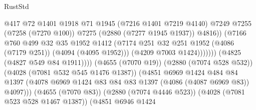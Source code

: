 \begin{lexlean}{RustStd}
\begin{coremodule}
                                              @417
                                              @72
                                              @1401
                                              @1918
                                              @71
                                              @1945
                                              (@7216 @1401 @7219 @4140)
                                              @7249
                                              @7255
                                              (@7258 (@7270 @100))
                                              @7275
                                              (@2880 (@7277 @1945 @1937))
                                              @4816))
                                          (@7166
                                            @760
                                            @499
                                            @32
                                            @35
                                            @1952
                                            @1412
                                            (@7174
                                              @251
                                              @32
                                              @251
                                              @1952
                                              (@4086 (@7179 @251))
                                              (@4094 (@4095 @1952)))
                                            (@4209 @7003 @1424)))))))
                                (@4825 (@4827 @549 @84 @1911))))
                            (@4655 (@7070 @19))
                            (@2880 (@7074 @528 @532))
                            (@4028 (@7081 @532 @545 @1476 @1387))
                            (@4851
                              @6969
                              @1424
                              @484
                              @84
                              @1397
                              (@4078
                                @6969
                                @1424
                                @83
                                @84
                                @83
                                @1397
                                (@4086 (@4087 @6969 @83))
                                @4097)))
                          (@4655 (@7070 @83))
                          (@2880 (@7074 @4446 @523))
                          (@4028 (@7081 @523 @528 @1467 @1387))
                          (@4851
                            @6946
                            @1424

\end{coremodule}
\end{lexlean}
